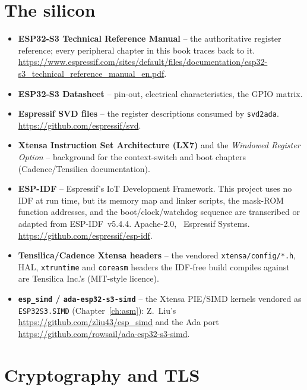 \section{The silicon}

\begin{itemize}
\item \textbf{ESP32-S3 Technical Reference Manual} -- the authoritative register
  reference; every peripheral chapter in this book traces back to it.
  \url{https://www.espressif.com/sites/default/files/documentation/esp32-s3_technical_reference_manual_en.pdf}.
\item \textbf{ESP32-S3 Datasheet} -- pin-out, electrical characteristics, the
  GPIO matrix.
\item \textbf{Espressif SVD files} -- the register descriptions consumed by
  \texttt{svd2ada}. \url{https://github.com/espressif/svd}.
\item \textbf{Xtensa Instruction Set Architecture (LX7)} and the
  \emph{Windowed Register Option} -- background for the context-switch and boot
  chapters (Cadence/Tensilica documentation).
\item \textbf{ESP-IDF} -- Espressif's IoT Development Framework. This project uses
  no IDF at run time, but its memory map and linker scripts, the mask-ROM function
  addresses, and the boot/clock/watchdog sequence are transcribed or adapted from
  ESP-IDF~v5.4.4. Apache-2.0, \textcopyright~Espressif Systems.
  \url{https://github.com/espressif/esp-idf}.
\item \textbf{Tensilica/Cadence Xtensa headers} -- the vendored
  \texttt{xtensa/config/*.h}, HAL, \texttt{xtruntime} and \texttt{coreasm} headers
  the IDF-free build compiles against are Tensilica Inc.'s (MIT-style licence).
\item \textbf{\texttt{esp\_simd} / \texttt{ada-esp32-s3-simd}} -- the Xtensa
  PIE/SIMD kernels vendored as \texttt{ESP32S3.SIMD} (Chapter~\ref{ch:asm}):
  Z.~Liu's \url{https://github.com/zliu43/esp_simd} and the Ada port
  \url{https://github.com/rowsail/ada-esp32-s3-simd}.
\end{itemize}

\section{Cryptography and TLS}

